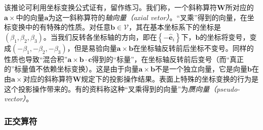 \documentclass[main.tex]{subfiles}
\begin{document}
该推论可利用坐标变换公式证有，留作练习。我们称，一个斜称算符$\mathbf{W}$所对应的$\mathbf{a}\times$中的向量$\mathbf{a}$为这一斜称算符的\emph{轴向量（axial vetor）}。“叉乘”得到的向量，在坐标变换中的有特殊的性质。对任意$\mathbf{b}\in\mathcal{V}$，其在基本坐标系下的坐标是$\left(\beta_1,\beta_2,\beta_3\right)$。当我们反转各坐标轴的方向，即在$\left\{-\mathbf{\hat{e}}_i\right\}$下，$\mathbf{b}$的坐标将变号，变成$\left(-\beta_1,-\beta_2,-\beta_3\right)$，但是易验向量$\mathbf{a}\times\mathbf{b}$在坐标轴反转前后坐标不变号。同样的性质也导致“混合积”$\mathbf{a}\times\mathbf{b}\cdot\mathbf{c}$得到的“标量”，在坐标轴反转前后变号（而“真正的”标量值不依赖坐标变换）。这是由于向量$\mathbf{a}\times\mathbf{b}$不是一个独立向量，它是向量$\mathbf{b}$在由$\mathbf{a}\times$对应的斜称算符$\mathbf{W}$规定下的投影操作结果。表面上特殊的坐标变换的行为是这个投影操作带来的。有的资料称这种“叉乘得到的向量”为\emph{赝向量（pseudo-vector）}。

\subsubsection{正交算符}
\end{document}
